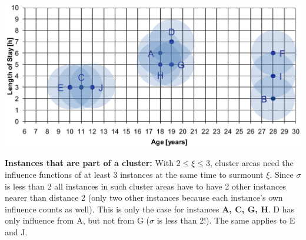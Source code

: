 \begin{breakbox}
\begin{center}
	\includegraphics[width=.15\textwidth]{slides_images/denclue_cluster}
\end{center}

\textbf{Instances that are part of a cluster:}
With $2 \le \xi \le 3$, cluster areas need the influence functions of at least 3 instances at the same time to surmount $\xi$. Since $\sigma$ is less than 2 all instances in such cluster areas have to have 2 other instances nearer than distance 2 (only two other instances because each instance's own influence counts as well). This is only the case for instances \textbf{A, C, G, H}. D has only influence from A, but not from G ($\sigma$ is less than 2!). The same applies to E and J.
\end{breakbox}